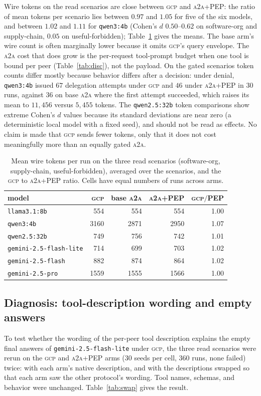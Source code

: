 \documentclass[conference,letterpaper]{IEEEtran}
\newcommand{\gcp}{\textsc{gcp}}
\newcommand{\ata}{\textsc{a2a}}
\begin{document}
Wire tokens on the read scenarios are close between \gcp{} and \ata{}+PEP: the ratio of mean tokens
per scenario lies between $0.97$ and $1.05$ for five of the six models, and between $1.02$ and $1.11$
for \texttt{qwen3:4b} (Cohen's $d$ $0.50$--$0.62$ on software-org and supply-chain, $0.05$ on
useful-forbidden); Table~\ref{tab:tokens} gives the means. The base arm's wire count
is often marginally lower because it omits \gcp{}'s query envelope. The \ata{} cost that does grow
is the per-request tool-prompt budget when one tool is bound per peer (Table~\ref{tab:disc}), not the
payload. On the gated scenarios token counts differ mostly because behavior differs after a decision:
under denial, \texttt{qwen3:4b} issued $67$ delegation attempts under \gcp{} and $46$ under
\ata{}+PEP in $30$ runs, against $36$ on base \ata{} where the first attempt succeeded, which raises its mean to
$11{,}456$ versus $5{,}455$ tokens. The \texttt{qwen2.5:32b} token comparisons show extreme Cohen's
$d$ values because its standard deviations are near zero (a deterministic local model with a fixed
seed), and should not be read as effects. No claim is made that \gcp{} sends fewer tokens, only that
it does not cost meaningfully more than an equally gated \ata{}.

\begin{table}[t]
\centering
\caption{Mean wire tokens per run on the three read scenarios (software-org, supply-chain,
useful-forbidden), averaged over the scenarios, and the \gcp{} to \ata{}+PEP ratio. Cells have equal
numbers of runs across arms.}
\label{tab:tokens}
\footnotesize
\setlength{\tabcolsep}{3pt}
\begin{tabular}{lrrrr}
\toprule
model & \gcp{} & base \ata{} & \ata{}+PEP & \gcp{}$/$PEP \\
\midrule
\texttt{llama3.1:8b} & 554 & 554 & 554 & 1.00 \\
\texttt{qwen3:4b} & 3160 & 2871 & 2950 & 1.07 \\
\texttt{qwen2.5:32b} & 749 & 756 & 742 & 1.01 \\
\texttt{gemini-2.5-flash-lite} & 714 & 699 & 703 & 1.02 \\
\texttt{gemini-2.5-flash} & 882 & 874 & 864 & 1.02 \\
\texttt{gemini-2.5-pro} & 1559 & 1555 & 1566 & 1.00 \\
\bottomrule
\end{tabular}
\end{table}

\subsection{Diagnosis: tool-description wording and empty answers}
\label{sec:swap}
To test whether the wording of the per-peer tool description explains the empty final answers of
\texttt{gemini-2.5-flash-lite} under \gcp{}, the three read scenarios were rerun on the \gcp{} and
\ata{}+PEP arms ($30$ seeds per cell, $360$ runs, none failed) twice: with each arm's native
description, and with the descriptions swapped so that each arm saw the other protocol's wording. Tool
names, schemas, and behavior were unchanged. Table~\ref{tab:swap} gives the result.
\end{document}
